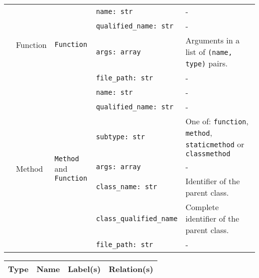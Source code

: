 \begin{table*}[h]
\begin{threeparttable}
\begin{tabular}{|p{1.6cm}||p{1.7cm}|p{2cm}|p{3.3cm}|p{7.5cm}|}
                        & \multirow{4}{*}{Function} & \multirow{4}{*}{\texttt{Function}} & \texttt{name: str}            & - \\ \cline{4-5}
                        &                           &                                   & \texttt{qualified\_name: str}  & - \\ \cline{4-5}
                        &                           &                                   & \texttt{args: array}             & Arguments in a list of \texttt{(name, type)} pairs. \\ \cline{4-5}
                        &                           &                                   & \texttt{file\_path: str}       & - \\ \cline{2-5}
                        
                        & \multirow{7}{*}{Method} & \multirow{7}{*}{\parbox{5cm}{\texttt{Method} and \\ \texttt{Function}}} & \texttt{name: str}       & - \\ \cline{4-5}
                        &                           &                                   & \texttt{qualified\_name: str}  & - \\ \cline{4-5}
                        &                           &                                   & \texttt{subtype: str}          & One of: \texttt{function}, \texttt{method}, \texttt{staticmethod} or \texttt{classmethod} \\ \cline{4-5}
                        &                           &                                   & \texttt{args: array}             & - \\ \cline{4-5}
                        &                           &                                   & \texttt{class\_name: str}      & Identifier of the parent class. \\ \cline{4-5}
                        &                           &                                   & \texttt{class\_qualified\_name} & Complete identifier of the parent class.\\ \cline{4-5}
                        &                           &                                   & \texttt{file\_path: str}       & - \\ \cline{2-5}
\hline
\end{tabular}


\begin{tabular}{|p{1.6cm}||p{1.7cm}|p{2cm}|p{11.155cm}|}
\hline
\textbf{Type} & \textbf{Name} & \textbf{Label(s)} & \textbf{Relation(s)} \\
\hline



\end{tabular}
\end{threeparttable}
\end{table*}

